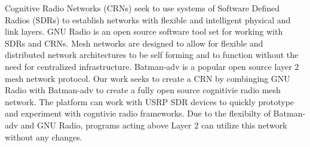 Cognitive Radio Networks (CRNs) seek to use systems of Software Defined Radios (SDRs) to establish
networks with flexible and intelligent physical and link layers. GNU Radio is an open source software
tool set for working with SDRs and CRNs.  Mesh networks are designed to allow for flexible and 
distributed network architectures to be self forming and to function without
the need for centralized infrastructure. Batman-adv is a popular open source layer 2 mesh network
protocol. Our work seeks to create a CRN by combinging GNU Radio with Batman-adv to create a fully open
source cognitivie radio mesh network. The platform can work with USRP SDR devices to quickly
prototype and experiment with cogntivie radio frameworks. Due to the flexibilty of Batman-adv
and GNU Radio, programs acting above Layer 2 can utilize this network without any changes.  

